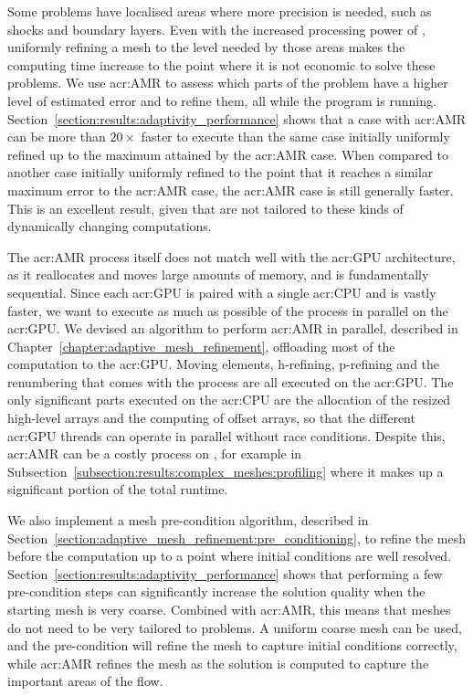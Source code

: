 Some problems have localised areas where more precision is needed, such as shocks and boundary
layers. Even with the increased processing power of , uniformly refining a mesh
to the level needed by those areas makes the computing time increase to the point where it is not
economic to solve these problems. We use \acrlong{acr:AMR} to assess which parts of the problem have
a higher level of estimated error and to refine them, all while the program is running.
Section~\ref{section:results:adaptivity_performance} shows that a case with \acrshort{acr:AMR} can
be more than \(20 \times \) faster to execute than the same case initially uniformly refined up to
the maximum attained by the \acrshort{acr:AMR} case. When compared to another case initially
uniformly refined to the point that it reaches a similar maximum error to the \acrshort{acr:AMR}
case, the \acrshort{acr:AMR} case is still generally faster. This is an excellent result, given that
 are not tailored to these kinds of dynamically changing computations. 

The \acrshort{acr:AMR} process itself does not match well with the \acrshort{acr:GPU} architecture,
as it reallocates and moves large amounts of memory, and is fundamentally sequential. Since each
\acrshort{acr:GPU} is paired with a single \acrshort{acr:CPU} and is vastly faster, we want to
execute as much as possible of the process in parallel on the \acrshort{acr:GPU}. We devised an
algorithm to perform \acrshort{acr:AMR} in parallel, described in
Chapter~\ref{chapter:adaptive_mesh_refinement}, offloading most of the computation to the
\acrshort{acr:GPU}. Moving elements, h-refining, p-refining and the renumbering that comes with the
process are all executed on the \acrshort{acr:GPU}. The only significant parts executed on the
\acrshort{acr:CPU} are the allocation of the resized high-level arrays and the computing of offset
arrays, so that the different \acrshort{acr:GPU} threads can operate in parallel without race
conditions. Despite this, \acrshort{acr:AMR} can be a costly process on , for
example in Subsection~\ref{subsection:results:complex_meshes:profiling} where it makes up a
significant portion of the total runtime.

We also implement a mesh pre-condition algorithm, described in
Section~\ref{section:adaptive_mesh_refinement:pre_conditioning}, to refine the mesh before the
computation up to a point where initial conditions are well resolved.
Section~\ref{section:results:adaptivity_performance} shows that performing a few pre-condition steps
can significantly increase the solution quality when the starting mesh is very coarse. Combined with
\acrshort{acr:AMR}, this means that meshes do not need to be very tailored to problems. A uniform
coarse mesh can be used, and the pre-condition will refine the mesh to capture initial conditions
correctly, while \acrshort{acr:AMR} refines the mesh as the solution is computed to capture the
important areas of the flow.

